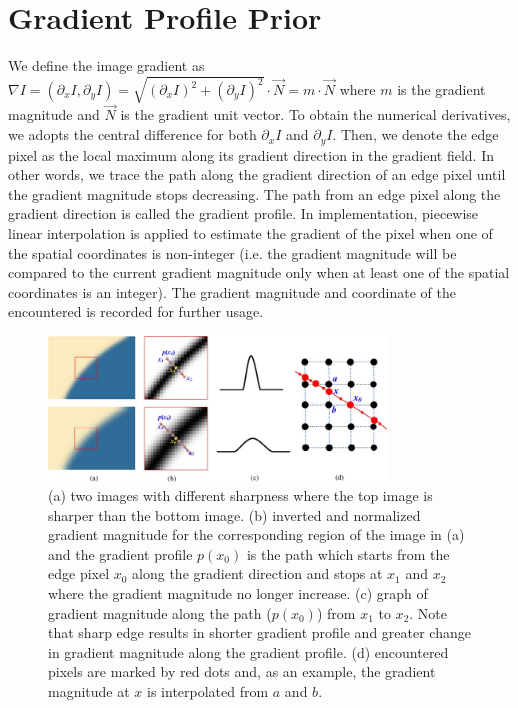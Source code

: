 \documentclass[a4paper,11pt]{article}
\begin{document}
\section{Gradient Profile Prior}
\label{Gradient Profile Prior}

We define the image gradient as $\nabla I = (\partial_x I, \partial_y I) = \sqrt{(\partial_x I)^2 + (\partial_y I)^2} \cdot \vec{N} = m \cdot \vec{N} $ where $m$ is the gradient magnitude and $\vec{N}$ is the gradient unit vector. To obtain the numerical derivatives, we adopts the central difference for both $\partial_x I$ and $\partial_y I$. Then, we denote the edge pixel as the local maximum along its gradient direction in the gradient field. In other words, we trace the path along the gradient direction of an edge pixel until the gradient magnitude stops decreasing. The path from an edge pixel along the gradient direction is called the gradient profile. In implementation, piecewise linear interpolation is applied to estimate the gradient of the pixel when one of the spatial coordinates is non-integer (i.e. the gradient magnitude will be compared to the current gradient magnitude only when at least one of the spatial coordinates is an integer). The gradient magnitude and coordinate of the encountered is recorded for further usage.

\begin{figure}[H]
	\centering
	\includegraphics[width=0.8\textwidth]{Gradient-profile-a-Two-edges-with-different-sharpness-b-Gradient-maps-normalized.png}
	\caption{(a) two images with different sharpness where the top image is sharper than the bottom image. (b) inverted and normalized gradient magnitude for the corresponding region of the image in (a) and the gradient profile $p(x_0)$ is the path which starts from the edge pixel $x_0$ along the gradient direction and stops at $x_1$ and $x_2$ where the gradient magnitude no longer increase. (c) graph of gradient magnitude along the path ($p(x_0)$) from  $x_1$ to $x_2$. Note that sharp edge results in shorter gradient profile and greater change in gradient magnitude along the gradient profile. (d) encountered pixels are marked by red dots and, as an example, the gradient magnitude at $x$ is interpolated from $a$ and $b$.}
	\label{fig:gp}
\end{figure}
\end{document}
